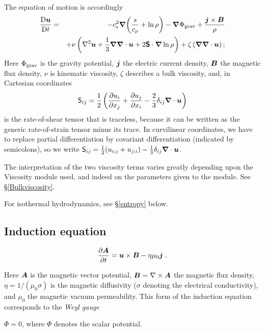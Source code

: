 \documentclass[\mydriver,12pt,twoside,notitlepage,a4paper]{article}
\makeatletter
\newcommand{\name}[2][]{%
  \def\index@{#1}%
  \textsl{#2\/}%
  \ifx\index@\@empty\index{#2@\MakeUppercase #2}%
  \else\index{#1}%
  \fi%
}
\newcommand{\De}      {\mathrm{D}}
\renewcommand{\vec}[1]{\mbox{\boldmath{$#1$}}}
\newcommand{\grad}    {\vec{\nabla}}
\newcommand{\Div}     {\vec{\nabla}\cdot}
\newcommand{\curl}    {\nabla\times}
\newcommand{\Laplace} {\nabla^2}
\newcommand{\Av}            {\vec{A}}
\newcommand{\Bv}            {\vec{B}}
\newcommand{\jv}            {\vec{j}}
\newcommand{\uv}            {\vec{u}}
\newcommand{\cs}            {c_{\rm s}}
\newcommand{\Strain}        {\boldsymbol{\mathsf{S}}}
\makeatother
\begin{document}
The equation of motion is accordingly
\begin{eqnarray}
  \frac{\De\uv}{\De t}
   =& &-\cs^2\grad\biggl(\frac{s}{c_p} + \ln\rho\biggr)
      - \grad\Phi_{\rm grav}
      + \frac{\jv\times\Bv}{\rho}  \nonumber \\
    & &+ \nu \left( \Laplace\uv + \frac{1}{3}\grad\Div\uv
      + 2\Strain\cdot\grad\ln\rho\right) + \zeta\left(\grad\Div\uv\right);
\label{DuDt}
\end{eqnarray}
Here $\Phi_{\rm grav}$ is the gravity potential,
$\jv$ the electric current density, $\Bv$
the magnetic flux density, $\nu$ is kinematic viscosity, $\zeta$ describes a bulk
viscosity, and, in Cartesian coordinates
\begin{equation} \label{Eq-S-traceless}
  {\mathsf S}_{ij} = \frac{1}{2}\left({\partial u_i\over\partial x_j}
                 + {\partial u_j\over\partial x_i}
                 -\frac{2}{3} \delta_{ij}\Div\uv\right)
\end{equation}
is the rate-of-shear tensor that is traceless, because it can be written as
the generic rate-of-strain tensor minus its trace.
In curvilinear coordinates, we have to replace partial differentiation
by covariant differentiation (indicated by semicolons), so we write
${\mathsf S}_{ij}=\frac{1}{2}(u_{i;j}+u_{j;i})-\frac{1}{3}\delta_{ij}\Div\uv$.

The interpretation of the two viscosity terms varies greatly depending upon
the Viscosity module used, and indeed on the parameters given to the module.
See \S\ref{Bulkviscosity}.

For isothermal hydrodynamics, see \S\ref{entropy} below.


\subsection{Induction equation}

\begin{equation}
  \frac{\partial\Av}{\partial t}
  = \uv\times\Bv - \eta\mu_0\jv \; .
\end{equation}

Here $\Av$ is the magnetic vector potential,
$\Bv = \curl\Av$ the magnetic
flux density, $\eta = 1/(\mu_0\sigma)$ is the magnetic diffusivity
($\sigma$ denoting the electrical conductivity), and $\mu_0$ the
magnetic vacuum permeability.
This form of the induction equation corresponds to the \name{Weyl gauge}
$\Phi=0$, where $\Phi$ denotes the scalar potential.
\end{document}
